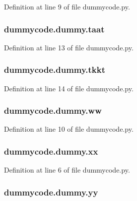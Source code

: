 Definition at line 9 of file dummycode.\-py.

\subsubsection[{taat}]{\setlength{\rightskip}{0pt plus 5cm}dummycode.\-dummy.\-taat}\label{classdummycode_1_1dummy_a638ed861d153ec60095bed0527eb89fc}


Definition at line 13 of file dummycode.\-py.

\subsubsection[{tkkt}]{\setlength{\rightskip}{0pt plus 5cm}dummycode.\-dummy.\-tkkt}\label{classdummycode_1_1dummy_ac97503870ca57fa0d663fcc8177e9f75}


Definition at line 14 of file dummycode.\-py.

\subsubsection[{ww}]{\setlength{\rightskip}{0pt plus 5cm}dummycode.\-dummy.\-ww}\label{classdummycode_1_1dummy_a65b1604eb43ffa41eb49a02655397fb7}


Definition at line 10 of file dummycode.\-py.

\subsubsection[{xx}]{\setlength{\rightskip}{0pt plus 5cm}dummycode.\-dummy.\-xx}\label{classdummycode_1_1dummy_af1ae41fb24a1c0a52ae60bd1f2db9f5f}


Definition at line 6 of file dummycode.\-py.

\subsubsection[{yy}]{\setlength{\rightskip}{0pt plus 5cm}dummycode.\-dummy.\-yy}\label{classdummycode_1_1dummy_ad0f056c4695b2525f883dbe1004fa7ba}


